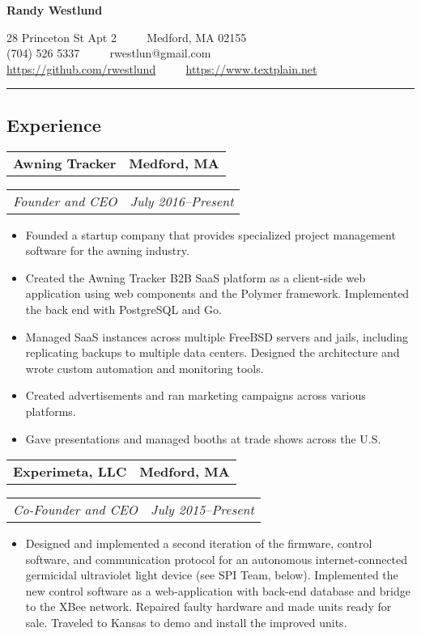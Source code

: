 \documentclass[10pt,letterpaper]{article}
\newcommand{\headerrow}[2]{%
    \begin{tabularx}{\linewidth}{Xr}
	    #1 & #2 \\
    \end{tabularx}
}
\begin{document}
\begin{center}
{\LARGE \textbf{Randy Westlund}}

28 Princeton St Apt 2 \ \ \textbullet%
    \ \ Medford, MA 02155 \\
(704) 526 5337 \ \ \textbullet%
    \ \ rwestlun@gmail.com \\
\url{https://github.com/rwestlund} \ \ \textbullet%
    \ \ \url{https://www.textplain.net}
\end{center}

\vspace{2pt}
\hrule
\vspace{-0.4em}
\subsection*{Experience}
	\headerrow{\textbf{Awning Tracker}}{\textbf{Medford, MA}}
	\headerrow{\textit{Founder and CEO}}{\textit{July 2016--Present}}
    \begin{itemize}[label=--]
        \item Founded a startup company that provides specialized project
            management software for the awning industry.

        \item Created the Awning Tracker B2B SaaS platform as a client-side web
            application using web components and the Polymer framework.
            Implemented the back end with PostgreSQL and Go.

        \item Managed SaaS instances across multiple FreeBSD servers and jails,
            including replicating backups to multiple data centers.  Designed
            the architecture and wrote custom automation and monitoring tools.

        \item Created advertisements and ran marketing campaigns across various
            platforms.

        \item Gave presentations and managed booths at trade shows across the U.S.
	\end{itemize}

    \headerrow{\textbf{Experimeta, LLC}}{\textbf{Medford, MA}}
    \headerrow{\textit{Co-Founder and CEO}}{\textit{July 2015--Present}}
    \begin{itemize}[label=--]
        \item Designed and implemented a second iteration of the firmware,
            control software, and communication protocol for an autonomous
            internet-connected germicidal ultraviolet light device (see SPI
            Team, below).  Implemented the new control software as a
            web-application with back-end database and bridge to the XBee
            network.  Repaired faulty hardware and made units ready for sale.
            Traveled to Kansas to demo and install the improved units.
    \end{itemize}
\end{document}

